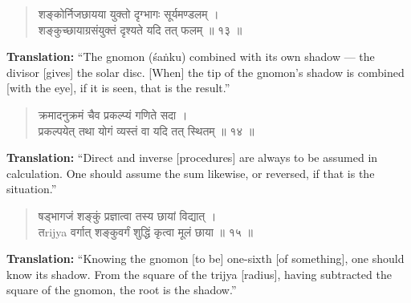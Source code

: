 \documentclass[11pt,a4paper]{article}
\newcommand{\dev}[1]{{\devanagarifont #1}}
\newenvironment{sanskritverse}{\begin{verse}\devanagarifont\large\centering}{\end{verse}}
\begin{document}
\vspace{0.5cm}

\begin{tcolorbox}[colback=white,colframe=rulecolor,title={\dev{\textbf{गणित १३ — छायाप्रमाणम् (Shadow Problems / Gnomon)}}}]
\begin{sanskritverse}
\dev{शङ्कोर्निजछायया युक्तो दृग्भागः सूर्यमण्डलम् ।\\
शङ्कुच्छायाग्रसंयुक्तं दृश्यते यदि तत् फलम् ॥ १३ ॥}
\end{sanskritverse}
\end{tcolorbox}

\vspace{0.3cm}
\noindent\textbf{Translation:} ``The gnomon (śaṅku) combined with its own shadow --- the divisor [gives] the solar disc. [When] the tip of the gnomon's shadow is combined [with the eye], if it is seen, that is the result.''

\vspace{0.5cm}

\begin{tcolorbox}[colback=white,colframe=rulecolor,title={\dev{\textbf{गणित १४ — गतिकालम् (Motion and Interpolation)}}}]
\begin{sanskritverse}
\dev{क्रमादनुक्रमं चैव प्रकल्प्यं गणिते सदा ।\\
प्रकल्पयेत् तथा योगं व्यस्तं वा यदि तत् स्थितम् ॥ १४ ॥}
\end{sanskritverse}
\end{tcolorbox}

\vspace{0.3cm}
\noindent\textbf{Translation:} ``Direct and inverse [procedures] are always to be assumed in calculation. One should assume the sum likewise, or reversed, if that is the situation.''

\vspace{0.5cm}

\begin{tcolorbox}[colback=white,colframe=rulecolor,title={\dev{\textbf{गणित १५ — शङ्कुनिर्माणम् (Construction of the Gnomon)}}}]
\begin{sanskritverse}
\dev{षड्‌भागजं शङ्कुं प्रज्ञात्वा तस्य छायां विद्यात् ।\\
तrijya वर्गात् शङ्कुवर्गं शुद्धिं कृत्वा मूलं छाया ॥ १५ ॥}
\end{sanskritverse}
\end{tcolorbox}

\vspace{0.3cm}
\noindent\textbf{Translation:} ``Knowing the gnomon [to be] one-sixth [of something], one should know its shadow. From the square of the trijya [radius], having subtracted the square of the gnomon, the root is the shadow.''
\end{document}

